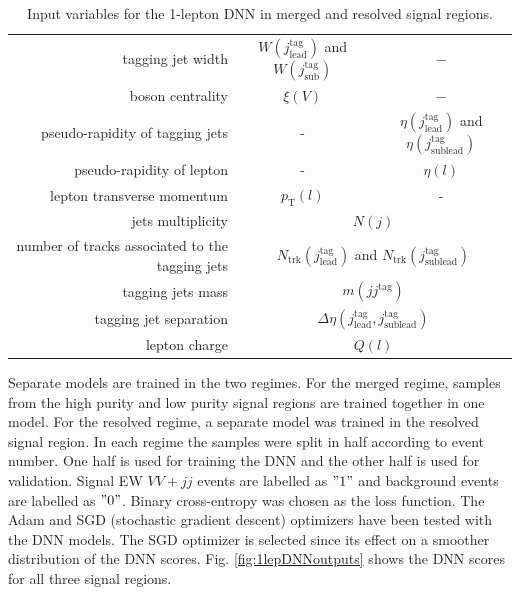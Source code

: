 \begin{table}[ht]
\begin{tabular}{r|c|c}
     tagging jet width & $W(j^\text{tag}_\text{lead})$ and $W(j^\text{tag}_\text{sub})$  & $ - $\\
     boson centrality & $\xi(V)$ & $ - $\\
     pseudo-rapidity of tagging jets & - & $\eta(j^\text{tag}_\text{lead})$ and $ \eta(j^\text{tag}_\text{sublead})$\\
     pseudo-rapidity of lepton & - & $\eta(l)$\\
     lepton transverse momentum & $p_\text{T}(l)$ & -\\
     jets multiplicity & \multicolumn{2}{c}{$N(j)$}\\
     number of tracks associated to the tagging jets & \multicolumn{2}{c}{$N_\text{trk}(j^\text{tag}_\text{lead})$ and $N_\text{trk}(j^\text{tag}_\text{sublead})$}\\
     tagging jets mass & \multicolumn{2}{c}{$m(jj^\text{tag})$}\\
     tagging jet separation & \multicolumn{2}{c}{$\Delta\eta(j^\text{tag}_\text{lead},j^\text{tag}_\text{sublead})$}\\
     lepton charge & \multicolumn{2}{c}{$Q(l)$}\\
    \end{tabular}
    \caption{Input variables for the 1-lepton DNN in merged and resolved signal regions.}
    \label{tab:1lepNN}
\end{table}

Separate models are trained in the two regimes.
For the merged regime, samples from the high purity and low purity signal regions are trained together in one model.
For the resolved regime, a separate model was trained in the resolved signal region.
In each regime the samples were split in half according to event number. One half is used for training the DNN and the other half is used for validation. Signal EW $VV+jj$ events are labelled as $"1"$ and background events are labelled as $"0"$.
Binary cross-entropy was chosen as the loss function.
The Adam and SGD (stochastic gradient descent) optimizers have been tested with the DNN models. The SGD optimizer is selected since its effect on a smoother distribution of the DNN scores. Fig. \ref{fig:1lepDNNoutputs} shows the DNN scores for all three signal regions. 

